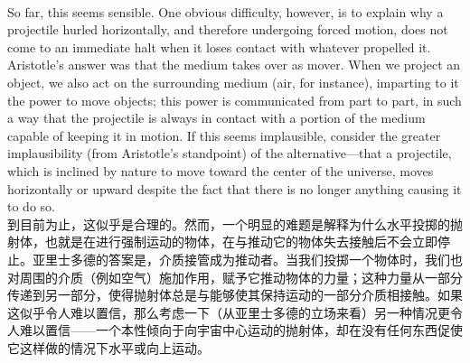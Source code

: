 \documentclass{article}
\begin{document}
\\
So far, this seems sensible. One obvious difficulty, however, is to explain why a projectile hurled horizontally, and therefore undergoing forced motion, does not come to an immediate halt when it loses contact with whatever propelled it. Aristotle’s answer was that the medium takes over as mover. When we project an object, we also act on the surrounding medium (air, for instance), imparting to it the power to move objects; this power is communicated from part to part, in such a way that the projectile is always in contact with a portion of the medium capable of keeping it in motion. If this seems implausible, consider the greater implausibility (from Aristotle’s standpoint) of the alternative—that a projectile, which is inclined by nature to move toward the center of the universe, moves horizontally or upward despite the fact that there is no longer anything causing it to do so.\\
到目前为止，这似乎是合理的。然而，一个明显的难题是解释为什么水平投掷的抛射体，也就是在进行强制运动的物体，在与推动它的物体失去接触后不会立即停止。亚里士多德的答案是，介质接管成为推动者。当我们投掷一个物体时，我们也对周围的介质（例如空气）施加作用，赋予它推动物体的力量；这种力量从一部分传递到另一部分，使得抛射体总是与能够使其保持运动的一部分介质相接触。如果这似乎令人难以置信，那么考虑一下（从亚里士多德的立场来看）另一种情况更令人难以置信——一个本性倾向于向宇宙中心运动的抛射体，却在没有任何东西促使它这样做的情况下水平或向上运动。 \\
\end{document}
